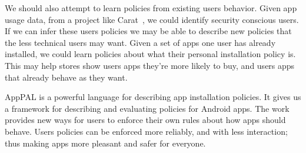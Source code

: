 \documentclass[a4paper]{scrartcl}
\begin{document}
We should also attempt to learn policies from existing users behavior.
Given app usage data, from a project like Carat~\citep{Oliner:2013ht}, we could identify security conscious users.
If we can infer these users policies we may be able to describe new policies that the less technical users may want.
Given a set of apps one user has already installed, we could learn policies about what their personal installation policy is.
This may help stores show users apps they're more likely to buy, and users apps that already behave as they want.

AppPAL is a powerful language for describing app installation policies.
It gives us a framework for describing and evaluating policies for Android apps.
The work provides new ways for users to enforce their own rules about how apps should behave.
Users policies can be enforced more reliably, and with less interaction;
thus making apps more pleasant and safer for everyone.



\end{document}
